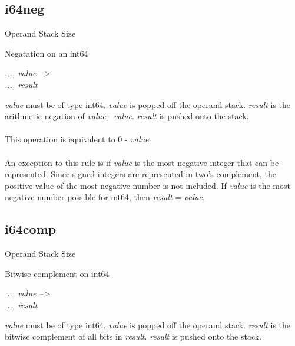 \documentclass[12pt]{article}
\begin{document}
		\newpage
		\subsection*{i64neg}
			\begin{labeling}{Operand Stack Size}
				\item [\textbf{Operation}] Negatation on an int64
				\item [\textbf{Format}] 
				\item [\textbf{Operand Stack}] \textit{..., value --\textgreater} \\
										\textit{..., result}
				\item [\textbf{Description}] \textit{value} must be of type int64. \textit{value} is popped off the operand stack. \textit{result} is the arithmetic negation of \textit{value}, -\textit{value}. \textit{result} is pushed onto the stack. \\ \\
				This operation is equivalent to 0 - \textit{value}. \\ \\
				An exception to this rule is if \textit{value} is the most negative integer that can be represented. Since signed integers are represented in two's complement, the positive value of the most negative number is not included. If \textit{value} is the most negative number possible for int64, then \textit{result} = \textit{value}.
			\end{labeling}	
			
		\newpage
		\subsection*{i64comp}
			\begin{labeling}{Operand Stack Size}
				\item [\textbf{Operation}] Bitwise complement on int64
				\item [\textbf{Format}] 
				\item [\textbf{Operand Stack}] \textit{..., value --\textgreater} \\
										\textit{..., result}
				\item [\textbf{Description}] \textit{value} must be of type int64. \textit{value} is popped off the operand stack. \textit{result} is the bitwise complement of all bits in \textit{result}. \textit{result} is pushed onto the stack. \\ \\
				
			\end{labeling}	
			
\end{document}
